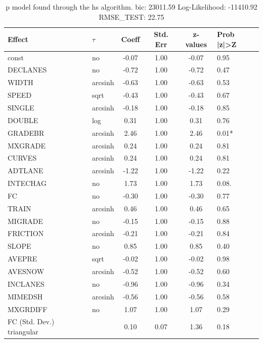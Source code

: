 \begin{table}
	\caption{p model found through the hs algorithm. bic: 23011.59 Log-Likelihood: -11410.92 RMSE_TEST: 22.75}
	\begin{center}
		\begin{tabular}{|l|l|c|c|c|l|}
			\hline
			Effect & $\tau$ & Coeff & Std. Err & z-values & Prob |z|>Z \\
			\hline
			const & no & -0.07 & 1.00 & -0.07 & 0.95 \\
			\hline
			DECLANES & no & -0.72 & 1.00 & -0.72 & 0.47 \\
			\hline
			WIDTH & arcsinh & -0.63 & 1.00 & -0.63 & 0.53 \\
			\hline
			SPEED & sqrt & -0.43 & 1.00 & -0.43 & 0.67 \\
			\hline
			SINGLE & arcsinh & -0.18 & 1.00 & -0.18 & 0.85 \\
			\hline
			DOUBLE & log & 0.31 & 1.00 & 0.31 & 0.76 \\
			\hline
			GRADEBR & arcsinh & 2.46 & 1.00 & 2.46 & 0.01* \\
			\hline
			MXGRADE & arcsinh & 0.24 & 1.00 & 0.24 & 0.81 \\
			\hline
			CURVES & arcsinh & 0.24 & 1.00 & 0.24 & 0.81 \\
			\hline
			ADTLANE & arcsinh & -1.22 & 1.00 & -1.22 & 0.22 \\
			\hline
			INTECHAG & no & 1.73 & 1.00 & 1.73 & 0.08. \\
			\hline
			FC & no & -0.30 & 1.00 & -0.30 & 0.77 \\
			\hline
			TRAIN & arcsinh & 0.46 & 1.00 & 0.46 & 0.65 \\
			\hline
			MIGRADE & no & -0.15 & 1.00 & -0.15 & 0.88 \\
			\hline
			FRICTION & arcsinh & -0.21 & 1.00 & -0.21 & 0.84 \\
			\hline
			SLOPE & no & 0.85 & 1.00 & 0.85 & 0.40 \\
			\hline
			AVEPRE & sqrt & -0.02 & 1.00 & -0.02 & 0.98 \\
			\hline
			AVESNOW & arcsinh & -0.52 & 1.00 & -0.52 & 0.60 \\
			\hline
			INCLANES & no & -0.96 & 1.00 & -0.96 & 0.34 \\
			\hline
			MIMEDSH & arcsinh & -0.56 & 1.00 & -0.56 & 0.58 \\
			\hline
			MXGRDIFF & no & 1.07 & 1.00 & 1.07 & 0.29 \\
			\hline
			FC (Std. Dev.) triangular &  & 0.10 & 0.07 & 1.36 & 0.18 \\

\end{tabular}
\end{center}
\end{table}
